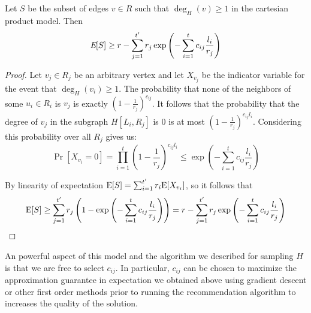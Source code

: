 \begin{thm}
Let $S$ be the subset of edges $v\in R$ such that $\deg_H(v) \geq 1$ in the cartesian product model. Then
\[ \emph{\text{E}}[S] \geq r - \sum_{j=1}^{t'} r_j \exp\left(-\sum_{i=1}^t c_{ij} \frac{l_i}{r_j}\right)\]
\end{thm}
\begin{proof}
Let $v_j \in R_j$ be an arbitrary vertex and let $X_{v_j}$ be the
indicator variable for the event that $\deg_H(v_i) \geq 1$. The
probability that none of the neighbors of some $u_i\in R_i$ is $v_j$
is exactly $(1-\frac{1}{r_j})^{c_{ij}}$. It follows that the
probability that the degree of $v_j$ in the subgraph $H[L_i,R_j]$ is 0
is at most $(1-\frac{1}{r_j})^{c_{ij}l_i}$. Considering this
probability over all $R_j$ gives us:
\[ \Pr[X_{v_i} = 0] = \prod_{i=1}^{t} \left(1-\frac{1}{r_j}\right)^{c_{ij} l_i} \leq \exp\left(-\sum_{i=1}^t c_{ij} \frac{l_i}{r_j}\right)\]

By linearity of expectation $\text{E}[S] = \sum_{i=1}^{t'} r_i \text{E}[X_{v_i}]$,
so it follows that
\[ \text{E}[S] \geq \sum_{j=1}^{t'} r_j \left(1-\exp\left(-\sum_{i=1}^t c_{ij} \frac{l_i}{r_j}\right)\right) = r - \sum_{j=1}^{t'} r_j \exp\left(-\sum_{i=1}^t c_{ij} \frac{l_i}{r_j}\right)\]
\end{proof}

An powerful aspect of this model and the algorithm
we described for sampling $H$ is that we are free to select $c_{ij}$.
In particular, $c_{ij}$ can be chosen to maximize the
approximation guarantee in expectation we obtained above using
gradient descent or other first order methods prior to running the
recommendation algorithm to increases the quality of the solution.